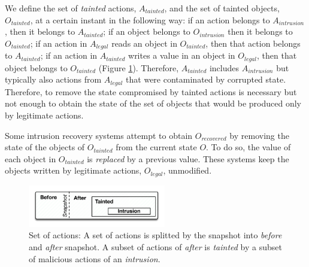 We define the set of \textit{tainted} actions, $A_{tainted}$, and the set of tainted objects, $O_{tainted}$, at a certain instant in the following way: if an action belongs to $A_{intrusion}$, then it belongs to $A_{tainted}$; if an object belongs to $O_{intrusion}$ then it belongs to $O_{tainted}$; if an action in $A_{legal}$ reads an object in $O_{tainted}$, then that action belongs to $A_{tainted}$; if an action in $A_{tainted}$ writes a value in an object in $O_{legal}$, then that object belongs to $O_{tainted}$  (Figure \ref{img:sets}). Therefore, $A_{tainted}$ includes $A_{intrusion}$ but typically also actions from $A_{legal}$ that were contaminated by corrupted state.  Therefore, to remove the state compromised by tainted actions is necessary but not enough to obtain the state of the set of objects that would be produced only by legitimate actions.


Some intrusion recovery systems \cite{taser,itdb,phoenix} attempt to obtain $O_{recovered}$ by removing 
the state of the objects of $O_{tainted}$ from the current state $O$. To do so, the value of each object in $O_{tainted}$ is \textit{replaced} by a previous value. These systems keep the objects written by legitimate actions, $O_{legal}$, unmodified.

\begin{figure}
  \centering
  \includegraphics[width=60mm]{images/sets}
  \caption{Set of actions: A set of actions is splitted by the snapshot into \textit{before} and \textit{after} snapshot. A subset of actions of \textit{after} is \textit{tainted} by a subset of malicious actions of an \textit{intrusion}.}
  \label{img:sets}
\end{figure}


